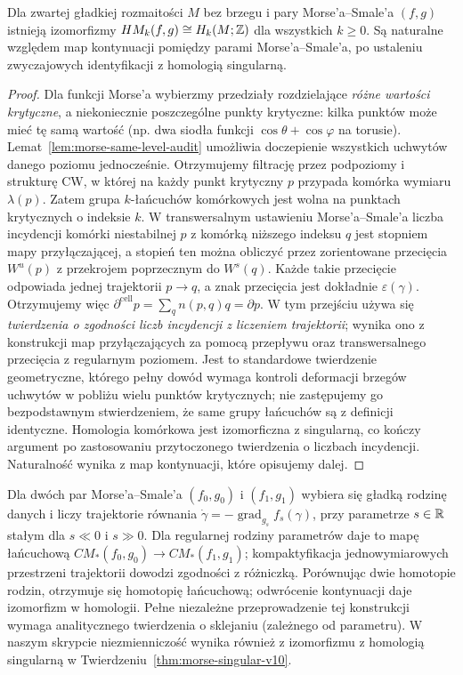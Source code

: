 \begin{twierdzenie}
\label{thm:morse-singular-v10}
Dla zwartej gładkiej rozmaitości $M$ bez brzegu i pary
Morse'a--Smale'a $(f,g)$ istnieją izomorfizmy
$HM_k(f,g)\cong H_k(M;\mathbb{Z})$ dla wszystkich $k\ge0$.
Są naturalne względem map kontynuacji pomiędzy
parami Morse'a--Smale'a, po ustaleniu zwyczajowych
identyfikacji z homologią singularną.
\end{twierdzenie}
\begin{proof}
Dla funkcji Morse'a wybierzmy przedziały rozdzielające
\emph{różne wartości krytyczne}, a niekoniecznie poszczególne
punkty krytyczne: kilka punktów może mieć tę samą wartość
(np. dwa siodła funkcji $\cos\theta+\cos\varphi$ na torusie).
Lemat~\ref{lem:morse-same-level-audit} umożliwia doczepienie
wszystkich uchwytów danego poziomu jednocześnie. Otrzymujemy
filtrację przez podpoziomy i strukturę CW, w której na każdy
punkt krytyczny $p$ przypada komórka wymiaru $\lambda(p)$.
Zatem grupa $k$-łańcuchów komórkowych jest wolna na punktach
krytycznych o indeksie $k$.
W transwersalnym ustawieniu Morse'a--Smale'a liczba
incydencji komórki niestabilnej $p$ z komórką
niższego indeksu $q$ jest stopniem mapy przyłączającej,
a stopień ten można obliczyć przez zorientowane przecięcia
$W^u(p)$ z przekrojem poprzecznym do $W^s(q)$.
Każde takie przecięcie odpowiada jednej trajektorii
$p\to q$, a znak przecięcia jest dokładnie
$\varepsilon(\gamma)$. Otrzymujemy więc
$\partial^{\mathrm{cell}}p=\sum_qn(p,q)q=\partial p$.
W tym przejściu używa się \emph{twierdzenia o zgodności
liczb incydencji z liczeniem trajektorii}; wynika ono
z konstrukcji map przyłączających za pomocą przepływu
oraz transwersalnego przecięcia z regularnym poziomem.
Jest to standardowe twierdzenie geometryczne, którego
pełny dowód wymaga kontroli deformacji brzegów
uchwytów w pobliżu wielu punktów krytycznych; nie
zastępujemy go bezpodstawnym stwierdzeniem, że
same grupy łańcuchów są z definicji identyczne.
Homologia komórkowa jest izomorficzna z singularną,
co kończy argument po zastosowaniu przytoczonego
twierdzenia o liczbach incydencji. Naturalność
wynika z map kontynuacji, które opisujemy dalej.
\end{proof}

\begin{uwaga}
Dla dwóch par Morse'a--Smale'a $(f_0,g_0)$ i $(f_1,g_1)$
wybiera się gładką rodzinę danych i liczy trajektorie równania
$\dot\gamma=-\operatorname{grad}_{g_s}f_s(\gamma)$,
przy parametrze $s\in\mathbb{R}$ stałym dla $s\ll0$ i $s\gg0$.
Dla regularnej rodziny parametrów daje to mapę łańcuchową
$CM_*(f_0,g_0)\to CM_*(f_1,g_1)$; kompaktyfikacja
jednowymiarowych przestrzeni trajektorii dowodzi zgodności
z różniczką. Porównując dwie homotopie rodzin,
otrzymuje się homotopię łańcuchową; odwrócenie
kontynuacji daje izomorfizm w homologii.
Pełne niezależne przeprowadzenie tej konstrukcji
wymaga analitycznego twierdzenia o sklejaniu
(zależnego od parametru). W naszym skrypcie
niezmienniczość wynika również z izomorfizmu
z homologią singularną w Twierdzeniu~\ref{thm:morse-singular-v10}.
\end{uwaga}

